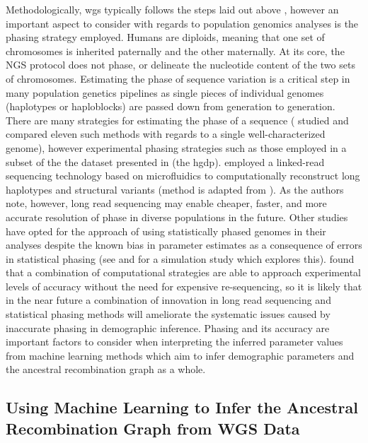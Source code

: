 Methodologically, \gls{wgs} typically follows the steps laid out above , however an important aspect to consider with regards to population genomics analyses is the phasing strategy employed. Humans are diploids, meaning that one set of chromosomes is inherited paternally and the other maternally. At its core, the NGS protocol does not phase, or delineate the nucleotide content of the two sets of chromosomes. Estimating the phase of sequence variation is a critical step in many population genetics pipelines as single pieces of individual genomes (haplotypes or haploblocks) are passed down from generation to generation. There are many strategies for estimating the phase of a sequence (\textcite{Choi2018} studied and compared eleven such methods with regards to a single well-characterized genome), however experimental phasing strategies such as those employed in a subset of the the dataset presented in \textcite{Bergstrom2019} (the \gls{hgdp}). \textcite{Bergstrom2019} employed a linked-read sequencing technology based on microfluidics to computationally reconstruct long haplotypes and structural variants (method is adapted from \cite{GX2016}). As the authors note, however, long read sequencing may enable cheaper, faster, and more accurate resolution of phase in diverse populations in the future. Other studies have opted for the approach of using statistically phased genomes in their analyses despite the known bias in parameter estimates as a consequence of errors in statistical phasing (see \textcite[Supplemental section 7]{Steinrucken2019} and \textcite{Raghavan2015a} for a simulation study which explores this). \textcite{Choi2018} found that a combination of computational strategies are able to approach experimental levels of accuracy without the need for expensive re-sequencing, so it is likely that in the near future a combination of innovation in long read sequencing and statistical phasing methods will ameliorate the systematic issues caused by inaccurate phasing in demographic inference. Phasing and its accuracy are important factors to consider when interpreting the inferred parameter values from machine learning methods which aim to infer demographic parameters and the ancestral recombination graph as a whole.

\subsection{Using Machine Learning to Infer the Ancestral Recombination Graph from WGS Data}

